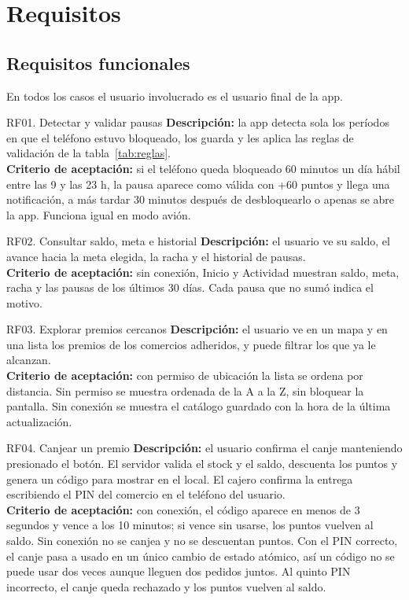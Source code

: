 \section{Requisitos}
\label{sec:requisitos}

\subsection{Requisitos funcionales}

En todos los casos el usuario involucrado es el usuario final de la app.

\begin{rf}{RF01. Detectar y validar pausas}
\textbf{Descripción:} la app detecta sola los períodos en que el teléfono estuvo bloqueado, los guarda y les aplica las reglas de validación de la tabla~\ref{tab:reglas}.\\
\textbf{Criterio de aceptación:} si el teléfono queda bloqueado 60 minutos un día hábil entre las 9 y las 23 h, la pausa aparece como válida con +60 puntos y llega una notificación, a más tardar 30 minutos después de desbloquearlo o apenas se abre la app. Funciona igual en modo avión.
\end{rf}

\begin{rf}{RF02. Consultar saldo, meta e historial}
\textbf{Descripción:} el usuario ve su saldo, el avance hacia la meta elegida, la racha y el historial de pausas.\\
\textbf{Criterio de aceptación:} sin conexión, Inicio y Actividad muestran saldo, meta, racha y las pausas de los últimos 30 días. Cada pausa que no sumó indica el motivo.
\end{rf}

\begin{rf}{RF03. Explorar premios cercanos}
\textbf{Descripción:} el usuario ve en un mapa y en una lista los premios de los comercios adheridos, y puede filtrar los que ya le alcanzan.\\
\textbf{Criterio de aceptación:} con permiso de ubicación la lista se ordena por distancia. Sin permiso se muestra ordenada de la A a la Z, sin bloquear la pantalla. Sin conexión se muestra el catálogo guardado con la hora de la última actualización.
\end{rf}

\begin{rf}{RF04. Canjear un premio}
\textbf{Descripción:} el usuario confirma el canje manteniendo presionado el botón. El servidor valida el stock y el saldo, descuenta los puntos y genera un código para mostrar en el local. El cajero confirma la entrega escribiendo el PIN del comercio en el teléfono del usuario.\\
\textbf{Criterio de aceptación:} con conexión, el código aparece en menos de 3 segundos y vence a los 10 minutos; si vence sin usarse, los puntos vuelven al saldo. Sin conexión no se canjea y no se descuentan puntos. Con el PIN correcto, el canje pasa a usado en un único cambio de estado atómico, así un código no se puede usar dos veces aunque lleguen dos pedidos juntos. Al quinto PIN incorrecto, el canje queda rechazado y los puntos vuelven al saldo.
\end{rf}

